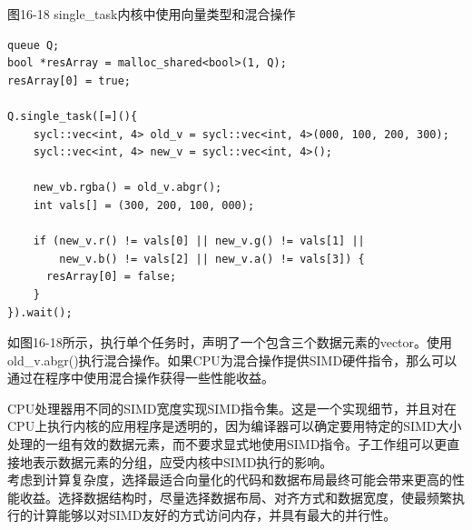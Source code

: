 \hspace*{\fill} \par %
图16-18 single\_task内核中使用向量类型和混合操作
\begin{lstlisting}[caption={}]
queue Q;
bool *resArray = malloc_shared<bool>(1, Q);
resArray[0] = true;

Q.single_task([=](){
	sycl::vec<int, 4> old_v = sycl::vec<int, 4>(000, 100, 200, 300);
	sycl::vec<int, 4> new_v = sycl::vec<int, 4>();
	
	new_vb.rgba() = old_v.abgr();
	int vals[] = (300, 200, 100, 000);
	
	if (new_v.r() != vals[0] || new_v.g() != vals[1] ||
	    new_v.b() != vals[2] || new_v.a() != vals[3]) {
      resArray[0] = false;    
    }
}).wait();
\end{lstlisting}

如图16-18所示，执行单个任务时，声明了一个包含三个数据元素的vector。使用old\_v.abgr()执行混合操作。如果CPU为混合操作提供SIMD硬件指令，那么可以通过在程序中使用混合操作获得一些性能收益。\par

\begin{tcolorbox}[colback=blue!5!white,colframe=blue!75!black, title=SIMD向量化指南]
CPU处理器用不同的SIMD宽度实现SIMD指令集。这是一个实现细节，并且对在CPU上执行内核的应用程序是透明的，因为编译器可以确定要用特定的SIMD大小处理的一组有效的数据元素，而不要求显式地使用SIMD指令。子工作组可以更直接地表示数据元素的分组，应受内核中SIMD执行的影响。\\

考虑到计算复杂度，选择最适合向量化的代码和数据布局最终可能会带来更高的性能收益。选择数据结构时，尽量选择数据布局、对齐方式和数据宽度，使最频繁执行的计算能够以对SIMD友好的方式访问内存，并具有最大的并行性。
\end{tcolorbox}








